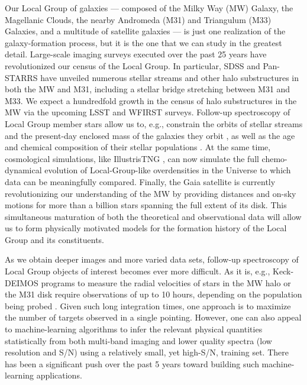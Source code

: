 \documentclass[oneside,11pt]{amsart}
\begin{document}
Our Local Group of galaxies --- composed of the Milky Way (MW) Galaxy,
the Magellanic Clouds, the nearby Andromeda (M31) and Triangulum (M33)
Galaxies, and a multitude of satellite galaxies --- is just one
realization of the galaxy-formation process, but it is the one that we
can study in the greatest detail.  Large-scale imaging surveys executed
over the past 25 years have revolutionized our census of the Local
Group.  In particular, SDSS and Pan-STARRS have unveiled numerous
stellar streams and other halo substructures in both the MW and M31,
including a stellar bridge stretching between M31 and M33.  We expect a
hundredfold growth in the census of halo substructures in the MW via the
upcoming LSST and WFIRST surveys.  Follow-up spectroscopy of Local Group
member stars allow us to, e.g., constrain the orbits of stellar streams
and the present-day enclosed mass of the galaxies they orbit
\citep{2017ApJ...836..234S}, as well as the age and chemical composition
of their stellar populations \citep{2019MNRAS.484.3425M}.  At the same
time, cosmological simulations, like IllustrisTNG
\citep{2018MNRAS.475..648P}, can now simulate the full chemo-dynamical
evolution of Local-Group-like overdensities in the Universe to which
data can be meaningfully compared.  Finally, the Gaia satellite is
currently revolutionizing our understanding of the MW by providing
distances and on-sky motions for more than a billion stars spanning the
full extent of its disk.  This simultaneous maturation of both the
theoretical and observational data will allow us to form physically
motivated models for the formation history of the Local Group and its
constituents.

As we obtain deeper images and more varied data sets, follow-up
spectroscopy of Local Group objects of interest becomes ever more
difficult.  As it is, e.g., Keck-DEIMOS programs to measure the radial
velocities of stars in the MW halo or the M31 disk require observations
of up to 10 hours, depending on the population being probed
\citep{2012ApJ...752...45T, 2018arXiv180904082C}.  Given such long
integration times, one approach is to maximize the number of targets
observed in a single pointing.  However, one can also appeal to
machine-learning algorithms to infer the relevant physical quantities
statistically from both multi-band imaging and lower quality spectra
(low resolution and S/N) using a relatively small, yet high-S/N,
training set.  There has been a significant push over the past 5 years
toward building such machine-learning applications.
\end{document}
